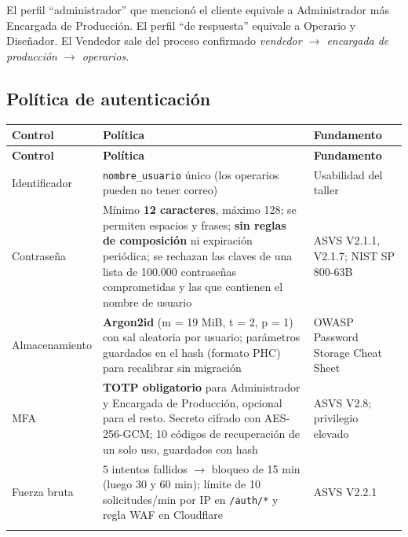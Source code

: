 \documentclass[11pt,a4paper]{article}
\begin{document}
El perfil ``administrador'' que mencionó el cliente equivale a Administrador más Encargada de Producción. El perfil ``de respuesta'' equivale a Operario y Diseñador. El Vendedor sale del proceso confirmado \textit{vendedor \ensuremath{\rightarrow}\allowbreak{} encargada de producción \ensuremath{\rightarrow}\allowbreak{} operarios}.

\subsection{Política de autenticación}

\begingroup
\begin{longtable}{@{}>{\raggedright\arraybackslash\hspace{0pt}}p{}>{\raggedright\arraybackslash\hspace{0pt}}p{}>{\raggedright\arraybackslash\hspace{0pt}}p{}@{}}
\toprule
\textbf{Control} & \textbf{Política} & \textbf{Fundamento} \\ \midrule
\endfirsthead
\toprule
\textbf{Control} & \textbf{Política} & \textbf{Fundamento} \\ \midrule
\endhead
\bottomrule
\endlastfoot
Identificador & \texttt{nombre\_\allowbreak{}usuario} único (los operarios pueden no tener correo) & Usabilidad del taller \\ \addlinespace[0.25em]
Contraseña & Mínimo \textbf{12 caracteres}, máximo 128; se permiten espacios y frases; \textbf{sin reglas de composición} ni expiración periódica; se rechazan las claves de una lista de 100.000 contraseñas comprometidas y las que contienen el nombre de usuario & ASVS V2.1.1, V2.1.7; NIST SP 800-63B \\ \addlinespace[0.25em]
Almacenamiento & \textbf{Argon2id} (m = 19 MiB, t = 2, p = 1) con sal aleatoria por usuario; parámetros guardados en el hash (formato PHC) para recalibrar sin migración & OWASP Password Storage Cheat Sheet \\ \addlinespace[0.25em]
\mbox{MFA} & \textbf{TOTP obligatorio} para Administrador y Encargada de Producción, opcional para el resto. Secreto cifrado con AES-256-GCM; 10 códigos de recuperación de un solo uso, guardados con hash & ASVS V2.8; privilegio elevado \\ \addlinespace[0.25em]
Fuerza bruta & 5 intentos fallidos \ensuremath{\rightarrow}\allowbreak{} bloqueo de 15 min (luego 30 y 60 min); límite de 10 solicitudes/min por IP en \texttt{/\allowbreak{}auth/\allowbreak{}*} y regla WAF en Cloudflare & ASVS V2.2.1 \\ \addlinespace[0.25em]

\end{longtable}
\end{document}
